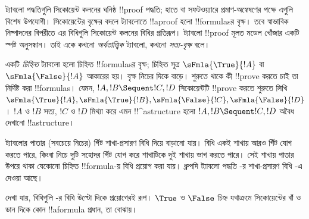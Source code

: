 \documentclass[../../../include/open-logic-section]{subfiles}
\begin{document}


ট্যাবলো পদ্ধতিগুলি সিকোয়েন্ট কলনের ঘনিষ্ঠ !!{proof} পদ্ধতি;
হাতে বা সফটওয়্যারে প্রমাণ-অন্বেষণের পক্ষে এগুলি বিশেষ উপযোগী।
সিকোয়েন্টের বৃক্ষের বদলে ট্যাবলোতে !!a{proof} হলো
!!{formula}sর বৃক্ষ। তবে স্বাভাবিক নিষ্পাদনের বিপরীতে
এর বিধিগুলি সিকোয়েন্ট কলনের বিধির প্রতিরূপ। ট্যাবলো
!!{proof} মূলত মডেল খোঁজার একটি স্পষ্ট অনুসন্ধান। তাই একে
কখনো \emph{অর্থতাত্ত্বিক} ট্যাবলো, কখনো \emph{সত্য-বৃক্ষ} বলে।

একটি \emph{চিহ্নিত} ট্যাবলো হলো চিহ্নিত !!{formula}sর
বৃক্ষ; চিহ্নিত সূত্র $\sFmla{\True}{!A}$ বা
$\sFmla{\False}{!A}$ আকারের হয়। বৃক্ষ নিচের দিকে বাড়ে।
শুরুতে থাকে কী !!{prove} করতে চাই তা নির্দিষ্ট করা
!!{formula}s। যেমন, $!A, !B \Sequent !C, !D$
সিকোয়েন্টটি !!{prove} করতে শুরুতে লিখি
$\sFmla{\True}{!A}, \sFmla{\True}{!B},
\sFmla{\False}{!C}, \sFmla{\False}{!D}$।
$!A$ ও $!B$ সত্য, $!C$ ও $!D$ মিথ্যা করে এমন
!!^a{structure} হলো $!A, !B \Sequent !C, !D$ অবৈধ
দেখানো !!a{structure}।

ট্যাবলোর পাতার (সবচেয়ে নিচের) গিঁট শাখা-প্রসারণ বিধি
দিয়ে বাড়ানো যায়। বিধি একই শাখায় আরও গিঁট যোগ করতে
পারে, কিংবা নিচে দুটি সহোদর গিঁট যোগ করে শাখাটিকে
দুই শাখায় ভাগ করতে পারে। সেই শাখায় পাতার উপরে থাকা
যেকোনো চিহ্নিত !!{formula}-য় বিধি প্রয়োগ করা যায়।
ধ্রুপদি ট্যাবলো পদ্ধতি -র শাখা-প্রসারণ বিধি
-এ দেওয়া আছে।



দেখা যায়, বিধিগুলি -র বিধি উল্টো দিকে
প্রয়োগেরই রূপ। $\True$ ও $\False$ চিহ্ন যথাক্রমে
সিকোয়েন্টের বাঁ ও ডান দিকে কোন !!a{formula} প্রধান,
তা বোঝায়।
\end{document}
